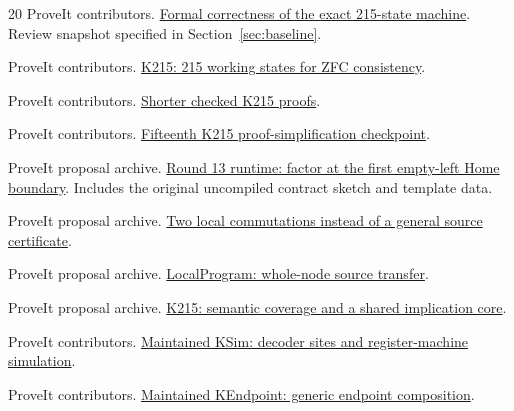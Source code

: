 \documentclass[11pt,letterpaper]{article}
\theoremstyle{definition}
\newcommand{\baseurl}{https://github.com/VladimirReshetnikov/ProveIt/blob/cbf94cb552a3b49509e0eee80e7455d4eb5974c6/}
\begin{document}
\begin{thebibliography}{20}
\small
{} ProveIt contributors.
\href{\baseurl Computability/BusyBeaver/Research/ZFC/k225-formal/verification/k215/README.md}{Formal correctness of the exact 215-state machine}.
Review snapshot specified in Section~\ref{sec:baseline}.

 ProveIt contributors.
\href{\baseurl Computability/BusyBeaver/Research/ZFC/candidate-k215/README.md}{K215: 215 working states for ZFC consistency}.

 ProveIt contributors.
\href{\baseurl Computability/BusyBeaver/Research/ZFC/k225-formal/verification/k215/simplification/README.md}{Shorter checked K215 proofs}.

 ProveIt contributors.
\href{\baseurl Computability/BusyBeaver/Research/ZFC/k225-formal/verification/k215/simplification/phase15/README.md}{Fifteenth K215 proof-simplification checkpoint}.

 ProveIt proposal archive.
\href{\baseurl Computability/BusyBeaver/Research/ZFC/k225-formal/verification/k215/simplification/proposals/round13-left-frame/runtime/README.md}{Round 13 runtime: factor at the first empty-left Home boundary}.
Includes the original uncompiled contract sketch and template data.

 ProveIt proposal archive.
\href{\baseurl Computability/BusyBeaver/Research/ZFC/k225-formal/verification/k215/simplification/proposals/k215-simplification-3/rocq/CFG_REPORT.md}{Two local commutations instead of a general source certificate}.

 ProveIt proposal archive.
\href{\baseurl Computability/BusyBeaver/Research/ZFC/k225-formal/verification/k215/simplification/proposals/common-macros/rocq/src/KLocal/LocalProgram.v}{LocalProgram: whole-node source transfer}.

 ProveIt proposal archive.
\href{\baseurl Computability/BusyBeaver/Research/ZFC/k225-formal/verification/k215/simplification/proposals/semantic-coverage/README.md}{K215: semantic coverage and a shared implication core}.

 ProveIt contributors.
\href{\baseurl Computability/BusyBeaver/Lean/BusyBeaver/ZFC/KSim.lean}{Maintained KSim: decoder sites and register-machine simulation}.

 ProveIt contributors.
\href{\baseurl Computability/BusyBeaver/Lean/BusyBeaver/ZFC/KEndpoint.lean}{Maintained KEndpoint: generic endpoint composition}.


\end{thebibliography}
\end{document}
